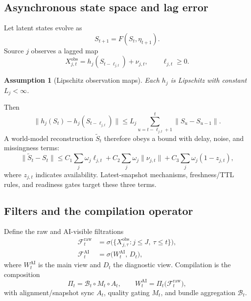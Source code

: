 \documentclass[12pt]{article}
\newtheorem{assumption}{Assumption}
\begin{document}
\subsection{Asynchronous state space and lag error}
Let latent states evolve as
\begin{equation}
S_{t+1}=F(S_t,\eta_{t+1}).
\label{eq:state}
\end{equation}
Source $j$ observes a lagged map
\begin{equation}
X^{\mathrm{obs}}_{j,t}=h_j(S_{t-\ell_{j,t}})+\nu_{j,t},\qquad \ell_{j,t}\ge 0.
\label{eq:lagobs}
\end{equation}
\begin{assumption}[Lipschitz observation maps]
Each $h_j$ is Lipschitz with constant $L_j<\infty$.
\end{assumption}
Then
\begin{equation}
\bigl\|h_j(S_t)-h_j(S_{t-\ell_{j,t}})\bigr\|
\le L_j\sum_{u=t-\ell_{j,t}+1}^{t}\|S_u-S_{u-1}\|.
\label{eq:lipschitz}
\end{equation}
A world-model reconstruction $\widetilde S_t$ therefore obeys a bound with delay, noise, and missingness terms:
\begin{equation}
\|\widetilde S_t-S_t\|
\le C_1\sum_j\omega_j\ell_{j,t}
+C_2\sum_j\omega_j\|\nu_{j,t}\|
+C_3\sum_j\omega_j(1-z_{j,t}),
\label{eq:recon}
\end{equation}
where $z_{j,t}$ indicates availability. Latest-snapshot mechanisms, freshness/TTL rules, and readiness gates target these three terms.

\subsection{Filters and the compilation operator}
Define the raw and AI-visible filtrations
\begin{align}
\mathcal{F}^{\mathrm{raw}}_t&=\sigma\bigl(\{X^{\mathrm{obs}}_{j,\tau}: j\le J,\ \tau\le t\}\bigr),
\label{eq:fraw}\\
\mathcal{F}^{\mathrm{AI}}_t&=\sigma\bigl(W^{\mathrm{AI}}_t,\,D_t\bigr),
\label{eq:fai}
\end{align}
where $W^{\mathrm{AI}}_t$ is the main view and $D_t$ the diagnostic view. Compilation is the composition
\begin{equation}
\Pi_t=\mathcal{B}_t\circ M_t\circ A_t,\qquad
W^{\mathrm{AI}}_t=\Pi_t\bigl(\mathcal{F}^{\mathrm{raw}}_t\bigr),
\label{eq:pi}
\end{equation}
with alignment/snapshot sync $A_t$, quality gating $M_t$, and bundle aggregation $\mathcal{B}_t$.
\end{document}
